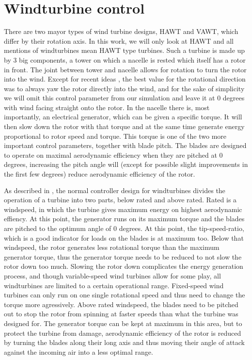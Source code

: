 \documentclass[hyperref,german,beleg]{cgvpub}
\begin{document}
\section{Windturbine control}
There are two mayor types of wind turbine designs, \ac{HAWT} and \ac{VAWT}, which differ by their rotation axis. In this work, we will only look at \ac{HAWT} and all mentions of windturbines mean \ac{HAWT} type turbines. Such a turbine is made up by 3 big components, a tower on which a nacelle is rested which itself has a rotor in front. 
The joint between tower and nacelle allows for rotation to turn the rotor into the wind. Except for recent ideas \cite{howlandWindFarmPower2019}, the best value for the rotational direction was to always yaw the rotor directly into the wind, and for the sake of simplicity we will omit this control parameter from our simulation and leave it at 0 degrees with wind facing straight onto the rotor.
In the nacelle there is, most importantly, an electrical generator, which can be given a specific torque. It will then slow down the rotor with that torque and at the same time generate energy proportional to rotor speed and torque. This torque is one of the two more important control parameters, together with blade pitch. The blades are designed to operate on maximal aerodynamic efficiency when they are pitched at 0 degrees, increasing the pitch angle will (except for possible slight improvements in the first few degrees) reduce aerodynamic efficiency of the rotor.

As described in \cite[sec 8.3]{burtonWindEnergyHandbook2011}, the normal controller design for windturbines divides the operation of a turbine into two parts, below rated and above rated. Rated is a windspeed, in which the turbine gives maximum energy on highest aerodynamic effiency. At this point, the generator runs on its maximum torque and the blades are pitched to the optimum angle of 0 degrees. At this point, the tip-speed-ratio, which is a good indicator for loads on the blades is at maximum too.
Below that windspeed, the rotor generates less rotational torque than the maximum generator torque, thus the generator torque needs to be reduced to not slow the rotor down too much. Slowing the rotor down complicates the energy generation process, and though variable-speed wind turbines allow for some play, all windturbines are limited to a certain operational range. Fixed-speed wind turbines can only run on one single rotational speed and thus need to change the torque more agressively.
Above rated windspeed, the blades need to be pitched out to stop the rotor from spinning at faster speeds than what the turbine was designed for. The generator torque can be kept at maximum in this area, but to protect the turbine from damage, aerodynamic efficiency of the rotor is reduced by turning the blades along their long axis and thus moving their angle of attack against the incoming air into a less optimal range.
\end{document}
